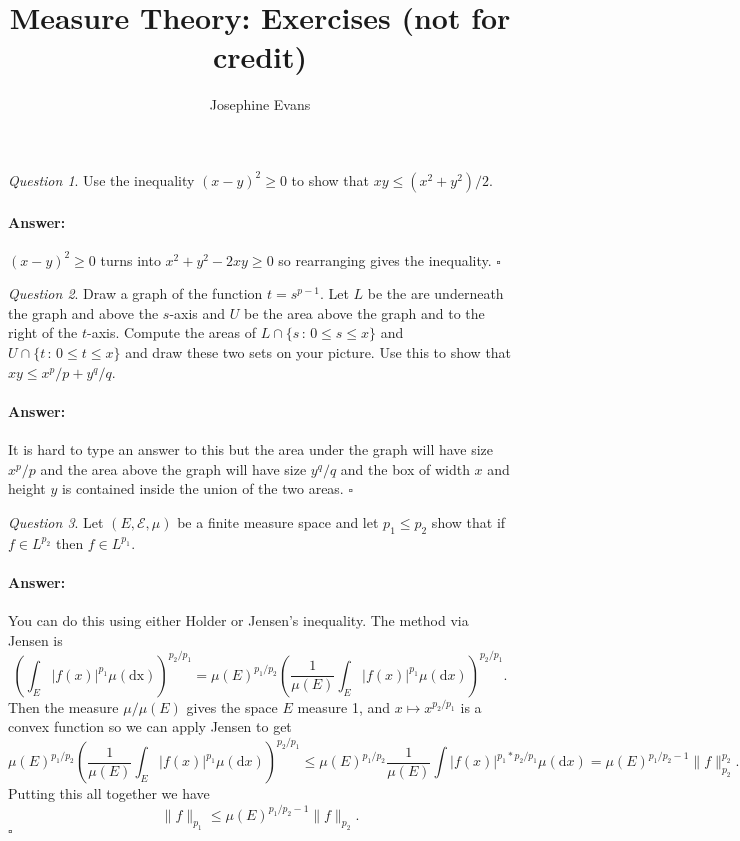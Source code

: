 \documentclass[11pt]{article}
\author{
Josephine Evans
}
\title{Measure Theory: Exercises (not for credit)}
\theoremstyle{definition}
\theoremstyle{remark}
\newtheorem{q}{Question}
\newenvironment{ans}{\paragraph{Answer:}}{\hfill$\square$\vspace{10pt}}
\begin{document}
\maketitle

\begin{q}
Use the inequality $(x-y)^2 \geq 0$ to show that $xy \leq (x^2 + y^2)/2$.
\end{q}
\begin{ans}
$(x-y)^2 \geq 0$ turns into $x^2 +y^2 -2xy \geq 0$ so rearranging gives the inequality.
\end{ans}

\begin{q}
Draw a graph of the function $t=s^{p-1}$. Let $L$ be the are underneath the graph and above the $s$-axis and $U$ be the area above the graph and to the right of the $t$-axis. Compute the areas of $L \cap \{s\,:\, 0\leq s \leq x\}$ and $U \cap \{t\,:\, 0 \leq t \leq x\}$ and draw these two sets on your picture. Use this to show that $xy \leq x^p/p +y^q/q$.
\end{q}
\begin{ans}
It is hard to type an answer to this but the area under the graph will have size $x^p/p$ and the area above the graph will have size $y^q/q$ and the box of width $x$ and height $y$ is contained inside the union of the two areas.
\end{ans}

\begin{q}
Let $(E,\mathcal{E}, \mu)$ be a finite measure space and let $p_1 \leq p_2$ show that if $f \in L^{p_2}$ then $f \in L^{p_1}$.
\end{q}
\begin{ans}
You can do this using either Holder or Jensen's inequality. The method via Jensen is
\[ \left(\int_E |f(x)|^{p_1} \mu(\mathrm{dx})\right)^{p_2/p_1} = \mu(E)^{p_1/p_2} \left( \frac{1}{\mu(E)} \int_E |f(x)|^{p_1} \mu(\mathrm{d}x) \right)^{p_2/p_1}.  \] Then the measure $\mu/\mu(E)$ gives the space $E$ measure 1, and $x \mapsto x^{p_2/p_1}$ is a convex function so we can apply Jensen to get
\[\mu(E)^{p_1/p_2} \left( \frac{1}{\mu(E)} \int_E |f(x)|^{p_1} \mu(\mathrm{d}x) \right)^{p_2/p_1} \leq \mu(E)^{p_1/p_2} \frac{1}{\mu(E)} \int |f(x)|^{p_1 * p_2/p_1} \mu(\mathrm{d}x) = \mu(E)^{p_1/p_2-1} \|f\|_{p_2}^{p_2}. \] Putting this all together we have
\[ \|f\|_{p_1} \leq \mu(E)^{p_1/p_2 -1} \|f\|_{p_2}. \]
\end{ans}
\end{document}
